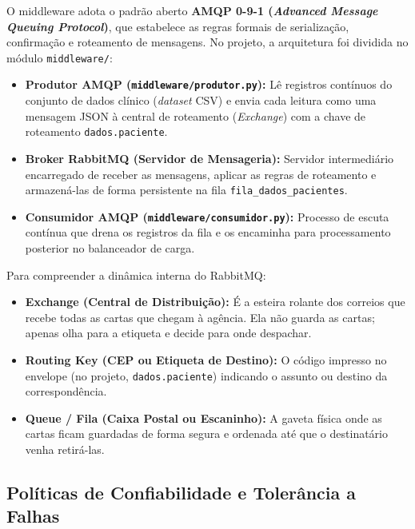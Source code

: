 \documentclass[11pt,a4paper]{article}
\begin{document}
O middleware adota o padrão aberto \textbf{AMQP 0-9-1 (\textit{Advanced Message Queuing Protocol})}, que estabelece as regras formais de serialização, confirmação e roteamento de mensagens. No projeto, a arquitetura foi dividida no módulo \texttt{middleware/}:

\begin{itemize}
    \item \textbf{Produtor AMQP (\texttt{middleware/produtor.py}):} Lê registros contínuos do conjunto de dados clínico (\textit{dataset} CSV) e envia cada leitura como uma mensagem JSON à central de roteamento (\textit{Exchange}) com a chave de roteamento \texttt{dados.paciente}.
    \item \textbf{Broker RabbitMQ (Servidor de Mensageria):} Servidor intermediário encarregado de receber as mensagens, aplicar as regras de roteamento e armazená-las de forma persistente na fila \texttt{fila\_dados\_pacientes}.
    \item \textbf{Consumidor AMQP (\texttt{middleware/consumidor.py}):} Processo de escuta contínua que drena os registros da fila e os encaminha para processamento posterior no balanceador de carga.
\end{itemize}

\begin{analogia}
Para compreender a dinâmica interna do RabbitMQ:
\begin{itemize}
    \item \textbf{Exchange (Central de Distribuição):} É a esteira rolante dos correios que recebe todas as cartas que chegam à agência. Ela não guarda as cartas; apenas olha para a etiqueta e decide para onde despachar.
    \item \textbf{Routing Key (CEP ou Etiqueta de Destino):} O código impresso no envelope (no projeto, \texttt{dados.paciente}) indicando o assunto ou destino da correspondência.
    \item \textbf{Queue / Fila (Caixa Postal ou Escaninho):} A gaveta física onde as cartas ficam guardadas de forma segura e ordenada até que o destinatário venha retirá-las.
\end{itemize}
\end{analogia}

\subsection{Políticas de Confiabilidade e Tolerância a Falhas}
\end{document}
